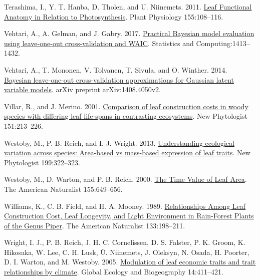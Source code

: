 \documentclass[
  12pt,
  a4paper,
,tablecaptionabove
]{scrartcl}
\newlength{\cslhangindent}
\newenvironment{CSLReferences}[2] %
 {%
  \setlength{\parindent}{0pt}
  \ifodd #1 \everypar{\setlength{\hangindent}{\cslhangindent}}\ignorespaces\fi
  \ifnum #2 > 0
  \setlength{\parskip}{#2\baselineskip}
  \fi
 }%
 {}
\begin{document}
\begin{CSLReferences}{1}{0}
\leavevmode{}%
Terashima, I., Y. T. Hanba, D. Tholen, and U. Niinemets. 2011.
\href{https://doi.org/10.1104/pp.110.165472}{Leaf {Functional Anatomy}
in {Relation} to {Photosynthesis}}. Plant Physiology 155:108--116.

\leavevmode{}%
Vehtari, A., A. Gelman, and J. Gabry. 2017.
\href{https://doi.org/10.1007/s11222-016-9696-4}{Practical {Bayesian}
model evaluation using leave-one-out cross-validation and {WAIC}}.
Statistics and Computing:1413--1432.

\leavevmode{}%
Vehtari, A., T. Mononen, V. Tolvanen, T. Sivula, and O. Winther. 2014.
\href{https://arxiv.org/abs/1408.4050v2}{Bayesian leave-one-out
cross-validation approximations for {Gaussian} latent variable models}.
arXiv preprint arXiv:1408.4050v2.

\leavevmode{}%
Villar, R., and J. Merino. 2001.
\href{https://doi.org/10.1046/j.1469-8137.2001.00147.x}{Comparison of
leaf construction costs in woody species with differing leaf life-spans
in contrasting ecosystems}. New Phytologist 151:213--226.

\leavevmode{}%
Westoby, M., P. B. Reich, and I. J. Wright. 2013.
\href{https://doi.org/10.1111/nph.12345}{Understanding ecological
variation across species: {Area-based} vs mass-based expression of leaf
traits}. New Phytologist 199:322--323.

\leavevmode{}%
Westoby, M., D. Warton, and P. B. Reich. 2000.
\href{https://doi.org/10.1086/303346}{The {Time Value} of {Leaf Area}}.
The American Naturalist 155:649--656.

\leavevmode{}%
Williams, K., C. B. Field, and H. A. Mooney. 1989.
\href{https://doi.org/10.1086/284910}{Relationships {Among Leaf
Construction Cost}, {Leaf Longevity}, and {Light Environment} in
{Rain-Forest Plants} of the {Genus Piper}}. The American Naturalist
133:198--211.

\leavevmode{}%
Wright, I. J., P. B. Reich, J. H. C. Cornelissen, D. S. Falster, P. K.
Groom, K. Hikosaka, W. Lee, C. H. Lusk, Ü. Niinemets, J. Oleksyn, N.
Osada, H. Poorter, D. I. Warton, and M. Westoby. 2005.
\href{https://doi.org/10.1111/j.1466-822x.2005.00172.x}{Modulation of
leaf economic traits and trait relationships by climate}. Global Ecology
and Biogeography 14:411--421.


\end{CSLReferences}
\end{document}
